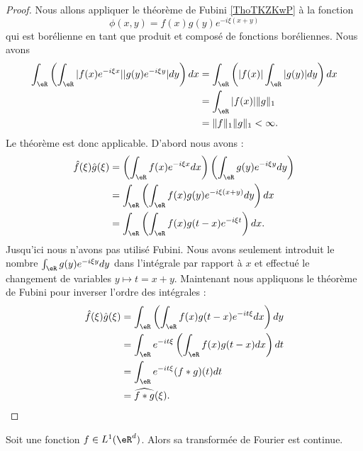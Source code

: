 \begin{proof}
    Nous allons appliquer le théorème de Fubini \ref{ThoTKZKwP} à la fonction
    \begin{equation}
        \phi(x,y)=f(x)g(y) e^{-i\xi(x+y)}
    \end{equation}
    qui est borélienne en tant que produit et composé de fonctions boréliennes. Nous avons
    \begin{subequations}
        \begin{align}
            \int_{\eR}\left( \int_{\eR}| f(x) e^{-i\xi x} | |g(y) e^{-i\xi y} |dy \right)dx&=\int_{\eR}\left( | f(x) |\int_{\eR}| g(y) |dy \right)dx\\
            &=\int_{\eR}| f(x) |\| g \|_1\\
            &=\| f \|_1\| g \|_1<\infty.
        \end{align}
    \end{subequations}
    Le théorème est donc applicable. D'abord nous avons :
    \begin{subequations}
        \begin{align}
            \hat f(\xi)\hat g(\xi)&=\left(\int_{\eR}f(x) e^{-i\xi x}dx\right)\left(\int_{\eR}g(y) e^{-i\xi y}dy\right)\\
            &=\int_{\eR}\left( \int_{\eR}f(x)g(y) e^{-i\xi(x+y)}dy \right)dx\\
            &=\int_{\eR}\left( \int_{\eR}f(x)g(t-x) e^{-i\xi t} \right)dx.
        \end{align}
    \end{subequations}
    Jusqu'ici nous n'avons pas utilisé Fubini. Nous avons seulement introduit le nombre \( \int_{\eR}g(y) e^{-i\xi y}dy\) dans l'intégrale par rapport à \( x\) et effectué le changement de variables \( y\mapsto t=x+y\). Maintenant nous appliquons le théorème de Fubini pour inverser l'ordre des intégrales :
    \begin{subequations}
        \begin{align}
            \hat f(\xi)\hat g(\xi)&=\int_{\eR}\left( \int_{\eR}f(x)g(t-x) e^{-it\xi}dx \right)dy\\
            &=\int_{\eR} e^{-it\xi}\left( \int_{\eR}f(x)g(t-x)dx \right)dt\\
            &=\int_{\eR} e^{-it\xi}(f*g)(t)dt\\
            &=\widehat{f*g}(\xi).
        \end{align}
    \end{subequations}
\end{proof}

\begin{proposition}       \label{PropJvNfj}
    Soit une fonction \( f\in L^1(\eR^d)\). Alors sa transformée de Fourier est continue.
\end{proposition}

